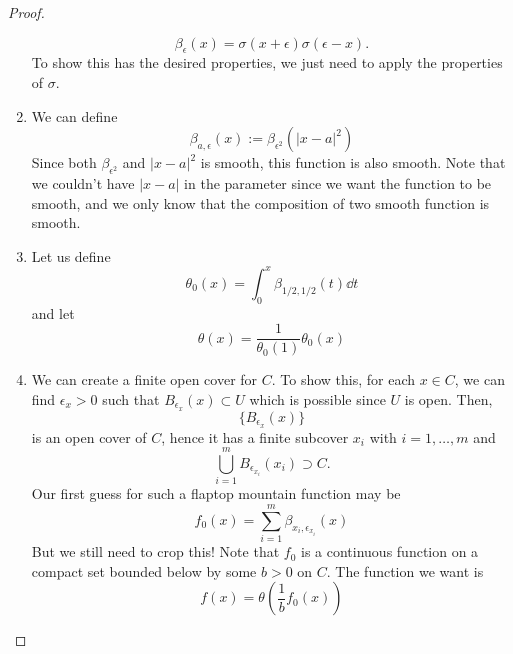 \documentclass{article}
\numberwithin{equation}{section}
\begin{document}
\begin{proof}
\begin{enumerate}
        \begin{equation}
            \beta_\epsilon(x) =  \sigma(x+\epsilon)\sigma(\epsilon-x).
        \end{equation}
        To show this has the desired properties, we just need to apply the properties of $\sigma$.
        \item We can define 
        \begin{equation}
            \beta_{a,\epsilon}(x) := \beta_{\epsilon^2}(|x-a|^2)
        \end{equation}
        Since both $\beta_{\epsilon^2}$ and $|x-a|^2$ is smooth, this function is also smooth. Note that we couldn't have $|x-a|$ in the parameter since we want the function to be smooth, and we only know that the composition of two smooth function is smooth.
        \item Let us define
        \begin{equation}
            \theta_0(x) = \int_0^x \beta_{1/2,1/2}(t) \dd{t}
        \end{equation}
        and let 
        \begin{equation}
            \theta(x) = \frac{1}{\theta_0(1)}\theta_0(x)
        \end{equation}
        \item We can create a finite open cover for $C$. To show this, for each $x\in C$, we can find $\epsilon_x > 0$ such that $B_{\epsilon_x}(x) \subset U$ which is possible since $U$ is open. Then,
        \begin{equation}
            \{B_{\epsilon_x}(x)\}
        \end{equation}
        is an open cover of $C$, hence it has a finite subcover $x_i$ with $i=1,\dots, m $ and 
        \begin{equation}
            \bigcup_{i=1}^m B_{\epsilon_{x_i}}(x_i) \supset C.
        \end{equation}
        Our first guess for such a flaptop mountain function may be 
        \begin{equation}
            f_0(x) = \sum_{i=1}^m \beta_{x_i,\epsilon_{x_i}}(x)
        \end{equation}
        But we still need to crop this! Note that $f_0$ is a continuous function on a compact set bounded below by some $b > 0$ on $C$. The function we want is 
        \begin{equation}
            f(x) = \theta\left(\frac{1}{b}f_0(x)\right)
        \end{equation}
        
    \end{enumerate}
\end{proof}
\end{document}
